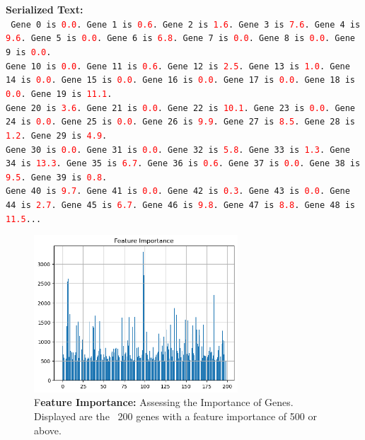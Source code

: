 \documentclass{article}
\theoremstyle{plain}
\theoremstyle{definition}
\theoremstyle{remark}
\begin{document}
\begin{mdframed}
\textbf{Serialized Text:}\\
\texttt{%
Gene 0 is \textcolor{red}{0.0}. Gene 1 is \textcolor{red}{0.6}. Gene 2 is \textcolor{red}{1.6}. Gene 3 is \textcolor{red}{7.6}. Gene 4 is \textcolor{red}{9.6}. Gene 5 is \textcolor{red}{0.0}. Gene 6 is \textcolor{red}{6.8}. Gene 7 is \textcolor{red}{0.0}. Gene 8 is \textcolor{red}{0.0}. Gene 9 is \textcolor{red}{0.0}. \\
Gene 10 is \textcolor{red}{0.0}. Gene 11 is \textcolor{red}{0.6}. Gene 12 is \textcolor{red}{2.5}. Gene 13 is \textcolor{red}{1.0}. Gene 14 is \textcolor{red}{0.0}. Gene 15 is \textcolor{red}{0.0}. Gene 16 is \textcolor{red}{0.0}. Gene 17 is \textcolor{red}{0.0}. Gene 18 is \textcolor{red}{0.0}. Gene 19 is \textcolor{red}{11.1}. \\
Gene 20 is \textcolor{red}{3.6}. Gene 21 is \textcolor{red}{0.0}. Gene 22 is \textcolor{red}{10.1}. Gene 23 is \textcolor{red}{0.0}. Gene 24 is \textcolor{red}{0.0}. Gene 25 is \textcolor{red}{0.0}. Gene 26 is \textcolor{red}{9.9}. Gene 27 is \textcolor{red}{8.5}. Gene 28 is \textcolor{red}{1.2}. Gene 29 is \textcolor{red}{4.9}. \\
Gene 30 is \textcolor{red}{0.0}. Gene 31 is \textcolor{red}{0.0}. Gene 32 is \textcolor{red}{5.8}. Gene 33 is \textcolor{red}{1.3}. Gene 34 is \textcolor{red}{13.3}. Gene 35 is \textcolor{red}{6.7}. Gene 36 is \textcolor{red}{0.6}. Gene 37 is \textcolor{red}{0.0}. Gene 38 is \textcolor{red}{9.5}. Gene 39 is \textcolor{red}{0.8}. \\
Gene 40 is \textcolor{red}{9.7}. Gene 41 is \textcolor{red}{0.0}. Gene 42 is \textcolor{red}{0.3}. Gene 43 is \textcolor{red}{0.0}. Gene 44 is \textcolor{red}{2.7}. Gene 45 is \textcolor{red}{6.7}. Gene 46 is \textcolor{red}{9.8}. Gene 47 is \textcolor{red}{8.8}. Gene 48 is \textcolor{red}{11.5}...
}
\end{mdframed}

\begin{figure}[H]
    \centering
    \includegraphics[width=3in]{fi.png}
    \caption{F\textbf{eature Importance:} Assessing the Importance of Genes. Displayed are the ~200 genes with a feature importance of 500 or above.}
    \label{fig:enter-label}
\end{figure}
\end{document}
